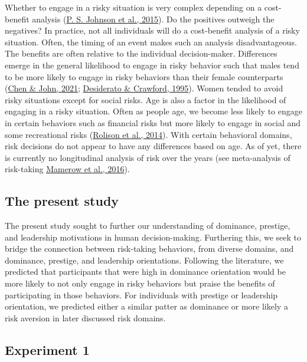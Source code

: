 \documentclass[
  donotrepeattitle,doc, 12pt, a4paper,floatsintext]{apa7}
\begin{document}
Whether to engage in a risky situation is very complex depending on a cost-benefit analysis (\protect\hyperlink{ref-johnson2015a}{P. S. Johnson et al., 2015}). Do the positives outweigh the negatives? In practice, not all individuals will do a cost-benefit analysis of a risky situation. Often, the timing of an event makes such an analysis disadvantageous. The benefits are often relative to the individual decision-maker. Differences emerge in the general likelihood to engage in risky behavior such that males tend to be more likely to engage in risky behaviors than their female counterparts (\protect\hyperlink{ref-chen2021}{Chen \& John, 2021}; \protect\hyperlink{ref-desiderato1995}{Desiderato \& Crawford, 1995}). Women tended to avoid risky situations except for social risks. Age is also a factor in the likelihood of engaging in a risky situation. Often as people age, we become less likely to engage in certain behaviors such as financial risks but more likely to engage in social and some recreational risks (\protect\hyperlink{ref-rolison2014}{Rolison et al., 2014}). With certain behavioral domains, risk decisions do not appear to have any differences based on age. As of yet, there is currently no longitudinal analysis of risk over the years (see meta-analysis of risk-taking \protect\hyperlink{ref-mamerow2016}{Mamerow et al., 2016}).

\hypertarget{the-present-study}{%
\subsection{The present study}\label{the-present-study}}

The present study sought to further our understanding of dominance, prestige, and leadership motivations in human decision-making. Furthering this, we seek to bridge the connection between risk-taking behaviors, from diverse domains, and dominance, prestige, and leadership orientations. Following the literature, we predicted that participants that were high in dominance orientation would be more likely to not only engage in risky behaviors but praise the benefits of participating in those behaviors. For individuals with prestige or leadership orientation, we predicted either a similar patter as dominance or more likely a risk aversion in later discussed risk domains.

\hypertarget{experiment-1}{%
\subsection{Experiment 1}\label{experiment-1}}
\end{document}
